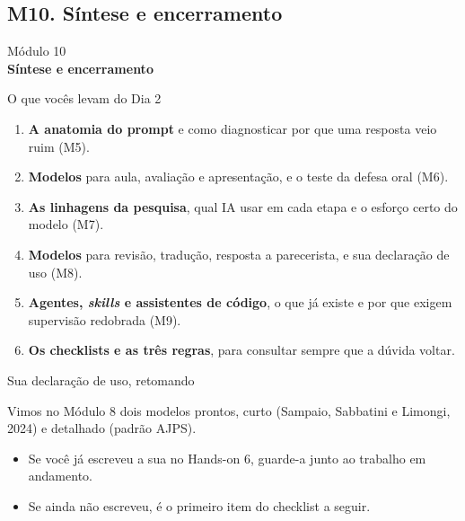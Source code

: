 \documentclass[11pt,aspectratio=169,t]{beamer}
\newcommand{\transicao}[2]{%
  \begin{frame}[plain]
    \centering
    \vspace*{2.2cm}
    {\large\color{cinzaescuro} #1}\\[0.8cm]
    {\Large\color{azulUNI}\textbf{#2}}
  \end{frame}}
\begin{document}
\subsection{M10. Síntese e encerramento}
\transicao{Módulo 10}{Síntese e encerramento}

\begin{frame}{O que vocês levam do Dia 2}
  \footnotesize
  \begin{enumerate}
    \item \textbf{A anatomia do prompt} e como diagnosticar por que uma resposta veio ruim (M5).
    \item \textbf{Modelos} para aula, avaliação e apresentação, e o teste da defesa oral (M6).
    \item \textbf{As linhagens da pesquisa}, qual IA usar em cada etapa e o esforço certo do modelo (M7).
    \item \textbf{Modelos} para revisão, tradução, resposta a parecerista, e sua declaração de uso (M8).
    \item \textbf{Agentes, \textit{skills} e assistentes de código}, o que já existe e por que exigem supervisão redobrada (M9).
    \item \textbf{Os checklists e as três regras}, para consultar sempre que a dúvida voltar.
  \end{enumerate}
\end{frame}

\begin{frame}{Sua declaração de uso, retomando}
  \begin{block}{}
    \centering Vimos no Módulo 8 dois modelos prontos, curto (Sampaio, Sabbatini e Limongi, 2024) e detalhado (padrão AJPS).
  \end{block}
  \pause
  \vfill
  \begin{itemize}
    \item Se você já escreveu a sua no Hands-on 6, guarde-a junto ao trabalho em andamento.
    \item Se ainda não escreveu, é o primeiro item do checklist a seguir.
  \end{itemize}
\end{frame}
\end{document}
